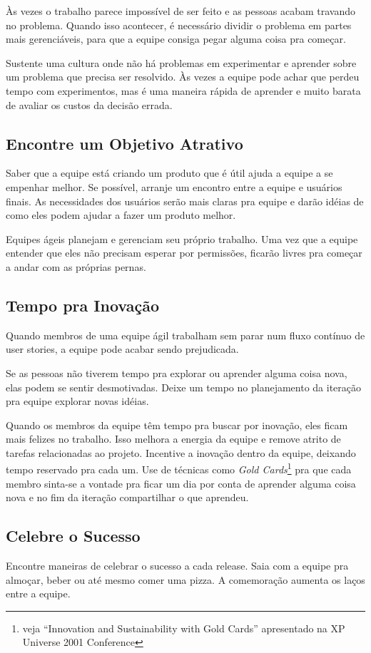 \documentclass[a4paper, 10pt, font=plain]{abnt}
\begin{document}
Às vezes o trabalho parece impossível de ser feito e as pessoas acabam travando no problema. Quando isso acontecer, é necessário dividir o problema em partes mais gerenciáveis, para que a equipe consiga pegar alguma coisa pra começar.

Sustente uma cultura onde não há problemas em experimentar e aprender sobre um problema que precisa ser resolvido. Às vezes a equipe pode achar que perdeu tempo com experimentos, mas é uma maneira rápida de aprender e muito barata de avaliar os custos da decisão errada.


\subsection{Encontre um Objetivo Atrativo}
Saber que a equipe está criando um produto que é útil ajuda a equipe a se empenhar melhor. Se possível, arranje um encontro entre a equipe e usuários finais. As necessidades dos usuários serão mais claras pra equipe e darão idéias de como eles podem ajudar a fazer um produto melhor.

Equipes ágeis planejam e gerenciam seu próprio trabalho. Uma vez que a equipe entender que eles não precisam esperar por permissões, ficarão livres pra começar a andar com as próprias pernas.


\subsection{Tempo pra Inovação}
Quando membros de uma equipe ágil trabalham sem parar num fluxo contínuo de user stories, a equipe pode acabar sendo prejudicada.

Se as pessoas não tiverem tempo pra explorar ou aprender alguma coisa nova, elas podem se sentir desmotivadas. Deixe um tempo no planejamento da iteração pra equipe explorar novas idéias.

Quando os membros da equipe têm tempo pra buscar por inovação, eles ficam mais felizes no trabalho. Isso melhora a energia da equipe e remove atrito de tarefas relacionadas ao projeto. Incentive a inovação dentro da equipe, deixando tempo reservado pra cada um. Use de técnicas como \textit{Gold Cards}\footnote{veja ``Innovation and Sustainability with Gold Cards'' apresentado na XP Universe 2001 Conference} pra que cada membro sinta-se a vontade pra ficar um dia por conta de aprender alguma coisa nova e no fim da iteração compartilhar o que aprendeu.


\subsection{Celebre o Sucesso}
Encontre maneiras de celebrar o sucesso a cada release. Saia com a equipe pra almoçar, beber ou até mesmo comer uma pizza. A comemoração aumenta os laços entre a equipe.
\end{document}
